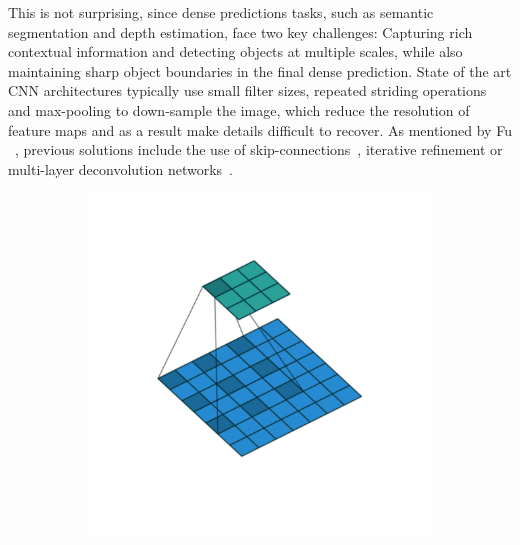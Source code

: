This is not surprising, since dense predictions tasks, such as semantic segmentation and depth estimation, face two key challenges: Capturing rich contextual information and detecting objects at multiple scales, while also maintaining sharp object boundaries in the final dense prediction.
State of the art CNN architectures typically use small filter sizes, repeated striding operations and max-pooling to down-sample the image, which reduce the resolution of feature maps and as a result make details difficult to recover.
As mentioned by Fu \etal~\cite{Fu2018}, previous solutions include the use of skip-connections~\cite{Ronneberger2015}, iterative refinement or multi-layer deconvolution networks~\cite{noh2015learning}. 
\begin{figure}
    \centering
    \begin{subfigure}[b]{0.35\linewidth}
    \includegraphics[width=1.0\linewidth]{images/concepts/dilation.pdf}
    \caption{}
    \label{fig:atrous-convolution}
    \end{subfigure}
    \begin{subfigure}[b]{0.6\linewidth}

\end{subfigure}
\end{figure}
